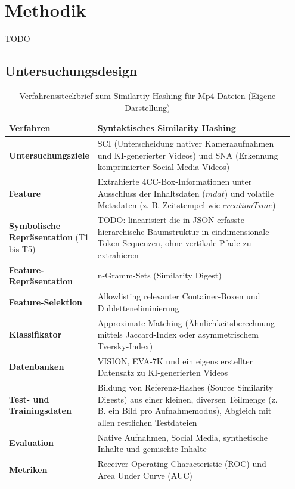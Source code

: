 \chapter{Methodik}

TODO


\section{Untersuchungsdesign}


\begin{table}[H]
    \centering
    \begin{tabular}{>{\raggedright\arraybackslash}p{0.2\linewidth}>{\raggedright\arraybackslash}p{0.75\linewidth}}\toprule\toprule
         \textbf{Verfahren}& Syntaktisches Similarity Hashing\\\hline\hline
         \textbf{Untersuchungsziele}& SCI (Unterscheidung nativer Kameraaufnahmen und KI-generierter Videos) und SNA (Erkennung komprimierter Social-Media-Videos)\\\hline
         \textbf{Feature}& Extrahierte 4CC-Box-Informationen unter Ausschluss der Inhaltsdaten (\(mdat\)) und volatile Metadaten (z. B. Zeitstempel wie \(creationTime\))\\\hline
         \textbf{Symbolische Repräsentation} (T1 bis T5)& TODO: linearisiert die in JSON erfasste hierarchische Baumstruktur in eindimensionale Token-Sequenzen, ohne vertikale Pfade zu extrahieren\\\hline
         \textbf{Feature-Repräsentation}& n-Gramm-Sets (Similarity Digest)\\\hline
         \textbf{Feature-Selektion}& Allowlisting relevanter Container-Boxen und Dubletteneliminierung\\\hline
         \textbf{Klassifikator}& Approximate Matching (Ähnlichkeitsberechnung mittels Jaccard-Index oder asymmetrischem Tversky-Index)\\\hline
         \textbf{Datenbanken}& VISION, EVA-7K und ein eigens erstellter Datensatz zu KI-generierten Videos\\\hline
         \textbf{Test- und Trainingsdaten}& Bildung von Referenz-Hashes (Source Similarity Digests) aus einer kleinen, diversen Teilmenge (z. B. ein Bild pro Aufnahmemodus), Abgleich mit allen restlichen Testdateien\\\hline
         \textbf{Evaluation}&Native Aufnahmen, Social Media, synthetische Inhalte und gemischte Inhalte\\\hline
         \textbf{Metriken}&Receiver Operating Characteristic (ROC) und Area Under Curve (AUC)\\ \bottomrule\bottomrule
    \end{tabular}
    \caption{Verfahrenssteckbrief zum Similartiy Hashing für Mp4-Dateien (Eigene Darstellung)}
    \label{tab:steckbrief-mp4}
\end{table}

